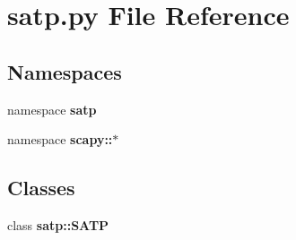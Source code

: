 \section{satp.py File Reference}
\label{satp_8py}
\subsection*{Namespaces}
\begin{CompactItemize}
\item 
namespace {\bf satp}
\item 
namespace {\bf scapy::$\ast$}
\end{CompactItemize}
\subsection*{Classes}
\begin{CompactItemize}
\item 
class {\bf satp::SATP}
\end{CompactItemize}
